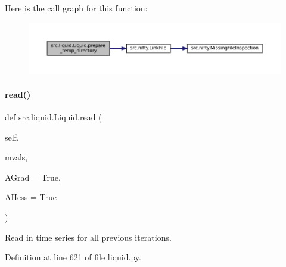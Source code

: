 Here is the call graph for this function\+:
\nopagebreak
\begin{figure}[H]
\begin{center}
\leavevmode
\includegraphics[width=350pt]{classsrc_1_1liquid_1_1Liquid_a8655401dad963220060fd4dbd4b2c39a_cgraph}
\end{center}
\end{figure}
\mbox{\label{classsrc_1_1liquid_1_1Liquid_ac70bf9d77fc3969a27a5ddba3ba4eb3a}} 
\paragraph{\texorpdfstring{read()}{read()}}
{\footnotesize\ttfamily def src.\+liquid.\+Liquid.\+read (\begin{DoxyParamCaption}\item[{}]{self,  }\item[{}]{mvals,  }\item[{}]{A\+Grad = {\ttfamily True},  }\item[{}]{A\+Hess = {\ttfamily True} }\end{DoxyParamCaption})}



Read in time series for all previous iterations. 



Definition at line 621 of file liquid.\+py.

